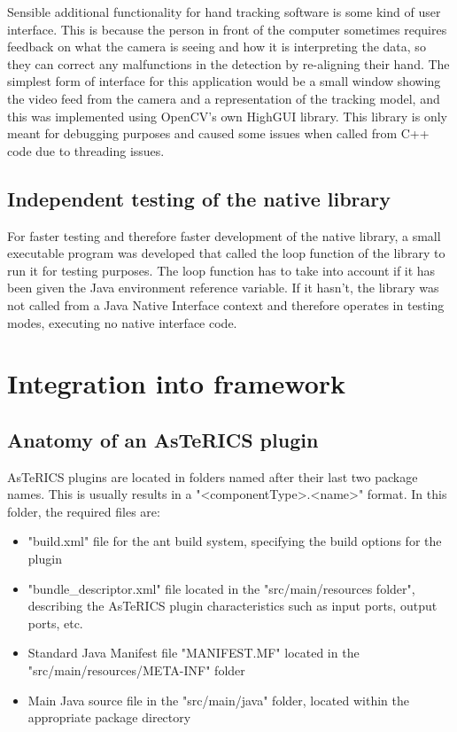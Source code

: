 \documentclass[BSA,Bachelor,english]{twbook}%
\begin{document}
Sensible additional functionality for hand tracking software is some kind of user interface. This is because the person in front of the computer sometimes requires feedback on what the camera is seeing and how it is interpreting the data, so they can correct any malfunctions in the detection by re-aligning their hand. The simplest form of interface for this application would be a small window showing the video feed from the camera and a representation of the tracking model, and this was implemented using OpenCV's own HighGUI library. This library is only meant for debugging purposes and caused some issues when called from C++ code due to threading issues.

\subsection{Independent testing of the native library}

For faster testing and therefore faster development of the native library, a small executable program was developed that called the loop function of the library to run it for testing purposes. The loop function has to take into account if it has been given the Java environment reference variable. If it hasn't, the library was not called from a Java Native Interface context and therefore operates in testing modes, executing no native interface code.

\section{Integration into framework}

\subsection{Anatomy of an AsTeRICS plugin}

AsTeRICS plugins are located in folders named after their last two package names. This is usually results in a "<componentType>.<name>" format. In this folder, the required files are:

\begin{itemize}
	\item "build.xml" file for the ant build system, specifying the build options for the plugin
	\item "bundle\_descriptor.xml" file located in the "src/main/resources folder", describing the AsTeRICS plugin characteristics such as input ports, output ports, etc.
	\item Standard Java Manifest file "MANIFEST.MF" located in the "src/main/resources/META-INF" folder
	\item Main Java source file in the "src/main/java" folder, located within the appropriate package directory
\end{itemize}
\end{document}
